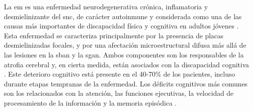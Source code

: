 
La \gls{em} es una enfermedad neurodegenerativa crónica, inflamatoria y desmielinizante del \gls{snc}, de carácter autoinmune y considerada como una de las causas más importantes de discapacidad física y cognitiva en adultos jóvenes \cite{Rocca2015ClinicalSclerosis}. Esta enfermedad se caracteriza principalmente por la presencia de placas desmielinizadas focales, y por una afectación microestructural difusa más allá de las lesiones en la \gls{sban} y la \gls{sgan}. Ambos componentes son los responsables de la atrofia cerebral y, en cierta medida, están asociados con la discapacidad cognitiva \cite{Kutzelnigg2014PathologyDiseases}. Este deterioro cognitivo está presente en el 40-70\% de los pacientes, incluso durante etapas tempranas de la enfermedad. Los déficits cognitivos más comunes son los relacionados con la atención, las funciones ejecutivas, la velocidad de procesamiento de la información y la memoria episódica \cite{Chiaravalloti2008CognitiveSclerosisb}. 

